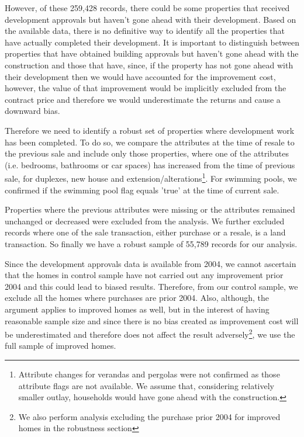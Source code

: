 \documentclass{article}
\begin{document}
However, of these 259,428 records, there could be some properties that received development approvals but haven't gone ahead with their development. Based on the available data, there is no definitive way to identify all the properties that have actually completed their development. It is important to distinguish between properties that have obtained building approvals but haven't gone ahead with the construction and those that have, since, if the property has not gone ahead with their development then we would have accounted for the improvement cost, however, the value of that improvement would be implicitly excluded from the contract price and therefore we would underestimate the returns and cause a downward bias.

Therefore we need to identify a robust set of properties where development work has been completed. To do so, we compare the attributes at the time of resale to the previous sale and include only those properties, where one of the attributes (i.e. bedrooms, bathrooms or car spaces) has increased from the time of previous sale, for duplexes, new house and extension/alterations\footnote{Attribute changes for verandas and pergolas were not confirmed as those attribute flags are not available. We assume that, considering relatively smaller outlay, households would have gone ahead with the construction.}. For swimming pools, we confirmed if the swimming pool flag equals 'true' at the time of current sale. 



\vspace*{-\baselineskip}


Properties where the previous attributes were missing or the attributes remained unchanged or decreased were excluded from the analysis. We further excluded records where one of the sale transaction, either purchase or a resale, is a land transaction. So finally we have a robust sample of 55,789 records for our analysis. 

Since the development approvals data is available from 2004, we cannot ascertain that the homes in control sample have not carried out any improvement prior 2004 and this could lead to biased results. Therefore, from our control sample, we exclude all the homes where purchases are prior 2004. Also, although, the argument applies to improved homes as well, but in the interest of having reasonable sample size and since there is no bias created as improvement cost will be underestimated and therefore does not affect the result adversely\footnote{We also perform analysis excluding the purchase prior 2004 for improved homes in the robustness section}, we use the full sample of improved homes.
\end{document}
